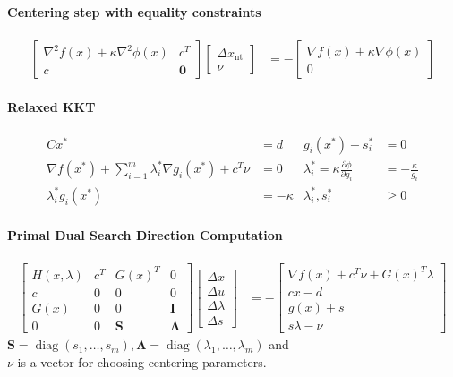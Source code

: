 \documentclass[landscape,a4paper,8pt]{scrartcl}
\newcommand\vI{\bm{I}}
\newcommand\vS{\bm{S}}
\newcommand{\Me}[1]{\begin{bmatrix}#1\end{bmatrix}} %
\DeclareMathOperator\diag{diag}
\begin{document}
\begin{multicols*}{3}
\paragraph{Centering step with equality constraints}
\begin{align*}
\Me{\nabla^2 f(x) + \kappa \nabla^2\phi(x) & c^T \\ c & \bm 0} \Me{\Delta x_\text{nt} \\ \nu} & = -\Me{\nabla f(x) + \kappa\nabla\phi(x) \\ 0}
\end{align*}

\paragraph{Relaxed KKT}
\begin{align*}
Cx^* & = d & g_i(x^*) + s_i^* & = 0 \\
\nabla f(x^*) + \sum_{i=1}^{m} \lambda_i^*\nabla g_i(x^*) + c^T \nu & = 0 & \lambda_i^* = \kappa\frac{\partial\phi}{\partial g_i} & = -\frac{\kappa}{g_i} \\
\lambda_i^*g_i(x^*) & = - \kappa & \lambda_i^*, s_i^* & \geq 0
\end{align*}

\paragraph{Primal Dual Search Direction Computation}
\begin{align*}
\Me{H(x,\lambda) & c^T & G(x)^T & 0 \\ c & 0 & 0 & 0 \\ G(x) & 0 & 0 & \vI \\ 0 & 0 & \vS & \bm \Lambda}\Me{\Delta x \\ \Delta u \\ \Delta \lambda \\ \Delta s} & = - \Me{\nabla f(x) + c^T\nu + G(x)^T\lambda \\ cx - d \\ g(x) + s \\ s\lambda - \nu}
\end{align*}
$\vS = \diag(s_1, \dots, s_m), \bm \Lambda = \diag(\lambda_1, \dots, \lambda_m)$ and \\
$\nu$ is a vector for choosing centering parameters.


\end{multicols*}
\end{document}
